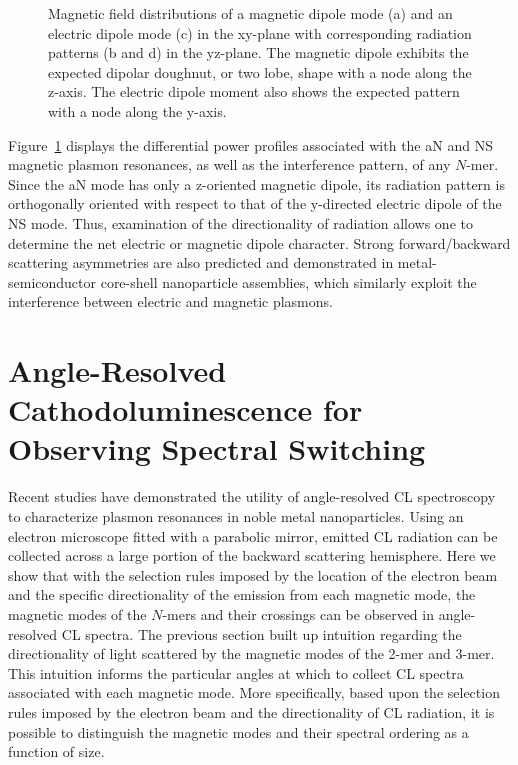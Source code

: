 \documentclass[journal=apchd5,manuscript=article]{achemso}
\begin{document}
\begin{figure}
\caption{Magnetic field distributions of a magnetic dipole mode (a) and an electric dipole mode (c) in the xy-plane with corresponding radiation patterns (b and d) in the yz-plane. The magnetic dipole exhibits the expected dipolar doughnut, or two lobe, shape with a node along the z-axis. The electric dipole moment also shows the expected pattern with a node along the y-axis.}
\label{scattering}
\end{figure}

Figure~\ref{scattering} displays the differential power profiles associated with the aN and NS magnetic plasmon resonances, as well as the interference pattern, of any $N$-mer. Since the aN mode has only a z-oriented magnetic dipole, its radiation pattern is orthogonally oriented with respect to that of the y-directed electric dipole of the NS mode. Thus, examination of the directionality of radiation allows one to determine the net electric or magnetic dipole character. Strong forward/backward scattering asymmetries are also predicted and demonstrated in metal-semiconductor core-shell nanoparticle assemblies, which similarly exploit the interference between electric and magnetic plasmons\cite{Kivshar2012}.

\section{Angle-Resolved Cathodoluminescence for Observing Spectral Switching}
Recent studies have demonstrated the utility of angle-resolved CL spectroscopy to characterize plasmon resonances in noble metal nanoparticles\cite{Coenen2011,CoPol2011,Abajo2013,Polman2014,ARPC}. Using an electron microscope fitted with a parabolic mirror, emitted CL radiation can be collected across a large portion of the backward scattering hemisphere\cite{Coenen2011,CoPol2011,Polman2014}. Here we show that with the selection rules imposed by the location of the electron beam and the specific directionality of the emission from each magnetic mode, the magnetic modes of the $N$-mers and their crossings can be observed in angle-resolved CL spectra. The previous section built up intuition regarding the directionality of light scattered by the magnetic modes of the 2-mer and 3-mer. This intuition informs the particular angles at which to collect CL spectra associated with each magnetic mode. More specifically, based upon the selection rules imposed by the electron beam and the directionality of CL radiation, it is possible to distinguish the magnetic modes and their spectral ordering as a function of size.
\end{document}
